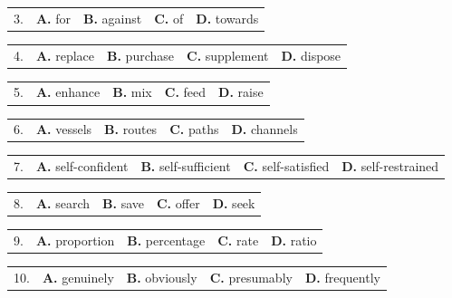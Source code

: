 \documentclass[UTF8,11pt]{ctexart}
\begin{document}
\noindent\begin{tabularx}{\linewidth}{@{}lXXXX@{}}3. & \textbf{A.} for & \textbf{B.} against & \textbf{C.} of & \textbf{D.} towards\\\end{tabularx}\par

\noindent\begin{tabularx}{\linewidth}{@{}lXXXX@{}}4. & \textbf{A.} replace & \textbf{B.} purchase & \textbf{C.} supplement & \textbf{D.} dispose\\\end{tabularx}\par

\noindent\begin{tabularx}{\linewidth}{@{}lXXXX@{}}5. & \textbf{A.} enhance & \textbf{B.} mix & \textbf{C.} feed & \textbf{D.} raise\\\end{tabularx}\par

\noindent\begin{tabularx}{\linewidth}{@{}lXXXX@{}}6. & \textbf{A.} vessels & \textbf{B.} routes & \textbf{C.} paths & \textbf{D.} channels\\\end{tabularx}\par

\noindent\begin{tabularx}{\linewidth}{@{}lXXXX@{}}7. & \textbf{A.} self-confident & \textbf{B.} self-sufficient & \textbf{C.} self-satisfied & \textbf{D.} self-restrained\\\end{tabularx}\par

\noindent\begin{tabularx}{\linewidth}{@{}lXXXX@{}}8. & \textbf{A.} search & \textbf{B.} save & \textbf{C.} offer & \textbf{D.} seek\\\end{tabularx}\par

\noindent\begin{tabularx}{\linewidth}{@{}lXXXX@{}}9. & \textbf{A.} proportion & \textbf{B.} percentage & \textbf{C.} rate & \textbf{D.} ratio\\\end{tabularx}\par

\noindent\begin{tabularx}{\linewidth}{@{}lXXXX@{}}10. & \textbf{A.} genuinely & \textbf{B.} obviously & \textbf{C.} presumably & \textbf{D.} frequently\\\end{tabularx}\par
\end{document}
